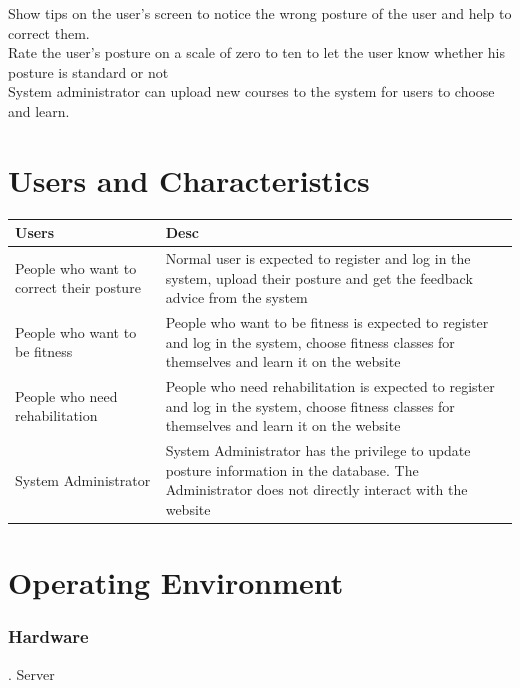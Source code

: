 \documentclass[16pt]{scrreprt}
\begin{document}
Show tips on the user's screen to notice the wrong posture of the user and help to correct them.\\


Rate the user's posture on a scale of zero to ten to let the user know whether his posture is standard or not\\


System administrator can upload new courses to the system for users to choose and learn.\\


\section{Users and Characteristics}

\begin{center}
    \begin{tabular}{p{5cm}p{11cm}}
        \hline
	    Users & Desc\\
        \hline
	    People who want to correct their posture &  Normal user is expected to register and log in the system, upload their posture and get the feedback advice from the system\\
        \hline
	    People who want to be fitness & People who want to be fitness is expected to register and log in the system, choose fitness classes for themselves and learn it on the website\\
        \hline
        People who need rehabilitation & People who need rehabilitation is expected to register and log in the system, choose fitness classes for themselves and learn it on the website\\
        \hline
        System Administrator & System Administrator has the privilege to update posture information in the database. The Administrator does not directly interact with the website\\
        \hline
    \end{tabular}
\end{center}

\section{Operating Environment}

\subsubsection{Hardware}


. Server\\
\end{document}
